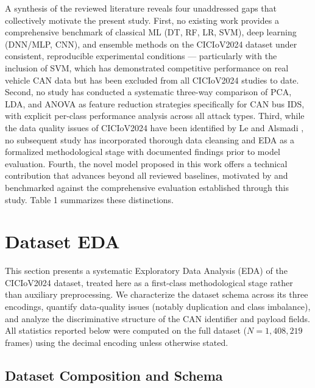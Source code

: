 \documentclass[conference]{IEEEtran}
\begin{document}
A synthesis of the reviewed literature reveals four unaddressed gaps that collectively motivate the present study. First, no existing work provides a comprehensive benchmark of classical ML (DT, RF, LR, SVM), deep learning (DNN/MLP, CNN), and ensemble methods on the CICIoV2024 dataset under consistent, reproducible experimental conditions — particularly with the inclusion of SVM, which has demonstrated competitive performance on real vehicle CAN data \cite{fi18010042} but has been excluded from all CICIoV2024 studies to date. Second, no study has conducted a systematic three-way comparison of PCA, LDA, and ANOVA as feature reduction strategies specifically for CAN bus IDS, with explicit per-class performance analysis across all attack types. Third, while the data quality issues of CICIoV2024 have been identified by Le and Alsmadi \cite{article_emre}, no subsequent study has incorporated thorough data cleansing and EDA as a formalized methodological stage with documented findings prior to model evaluation. Fourth, the novel model proposed in this work offers a technical contribution that advances beyond all reviewed baselines, motivated by and benchmarked against the comprehensive evaluation established through this study. Table 1 summarizes these distinctions.


\section{Dataset EDA}
\label{sec:Dataset_EDA}

This section presents a systematic Exploratory Data Analysis (EDA) of the
CICIoV2024 dataset, treated here as a first-class methodological stage rather
than auxiliary preprocessing. We characterize the dataset schema across its three
encodings, quantify data-quality issues (notably duplication and class
imbalance), and analyze the discriminative structure of the CAN identifier and
payload fields. All statistics reported below were computed on the full dataset
($N=1{,}408{,}219$ frames) using the decimal encoding unless otherwise stated.

\subsection{Dataset Composition and Schema}
\end{document}
